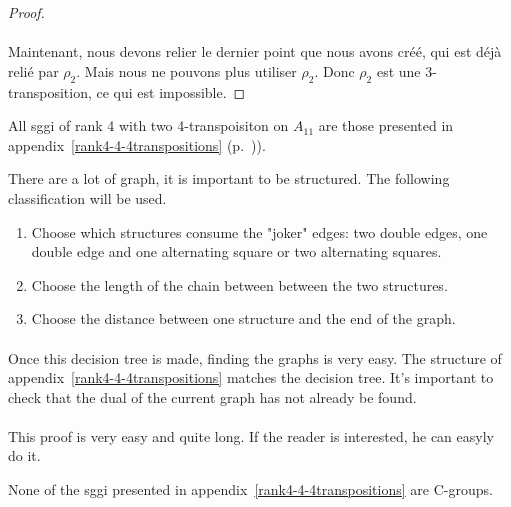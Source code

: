 \begin{proof}
  \paragraph{}
  Maintenant, nous devons relier le dernier point que nous avons créé, qui est déjà relié par $\rho_2$. Mais nous ne pouvons plus utiliser $\rho_2$. Donc $\rho_2$ est une 3-transposition, ce qui est impossible.

\end{proof}

\begin{theorem}
  All sggi of rank 4 with two 4-transpoisiton on $A_{11}$ are those presented in appendix~\ref{rank4-4-4transpositions} (p.~\pageref{rank4-4-4transpositions})).
\end{theorem}

There are a lot of graph, it is important to be structured. The following classification will be used.

\begin{enumerate}
  \item Choose which structures consume the "joker" edges: two double edges, one double edge and one alternating square or two alternating squares.
  \item Choose the length of the chain between between the two structures.
  \item Choose the distance between one structure and the end of the graph.
\end{enumerate}

\paragraph{}
Once this decision tree is made, finding the graphs is very easy. The structure of appendix~\ref{rank4-4-4transpositions} matches the decision tree. It's important to check that the dual of the current graph has not already be found.

\paragraph{}
This proof is very easy and quite long. If the reader is interested, he can easyly do it.

\begin{theorem}
  None of the sggi presented in appendix~\ref{rank4-4-4transpositions} are C-groups.
\end{theorem}


